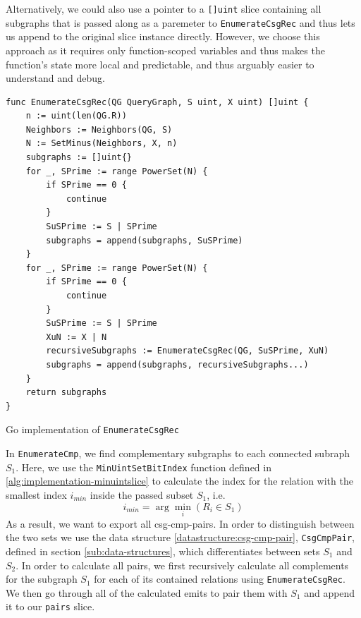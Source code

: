 \begin{note}
Alternatively, we could also use a pointer to a \texttt{[]uint} slice containing all subgraphs that is passed along as a paremeter to \texttt{EnumerateCsgRec} and thus lets us append to the original slice instance directly. However, we choose this approach as it requires only function-scoped variables and thus makes the function's state more local and predictable, and thus arguably easier to understand and debug.
\end{note}

\vspace{0.4cm}
\begin{algorithm}[H]
\begin{verbatim}
func EnumerateCsgRec(QG QueryGraph, S uint, X uint) []uint {
    n := uint(len(QG.R))
    Neighbors := Neighbors(QG, S)
    N := SetMinus(Neighbors, X, n)
    subgraphs := []uint{}
    for _, SPrime := range PowerSet(N) {
        if SPrime == 0 {
            continue
        }
        SuSPrime := S | SPrime
        subgraphs = append(subgraphs, SuSPrime)
    }
    for _, SPrime := range PowerSet(N) {
        if SPrime == 0 {
            continue
        }
        SuSPrime := S | SPrime
        XuN := X | N
        recursiveSubgraphs := EnumerateCsgRec(QG, SuSPrime, XuN)
        subgraphs = append(subgraphs, recursiveSubgraphs...)
    }
    return subgraphs
}
\end{verbatim}
\caption{Go implementation of \texttt{EnumerateCsgRec}}
\label{alg:enumeratecsgrec}
\end{algorithm}

In \texttt{EnumerateCmp}, we find complementary subgraphs to each connected subraph $S_1$.
Here, we use the \texttt{MinUintSetBitIndex} function defined in \ref{alg:implementation-minuintslice} to calculate the index for the relation with the smallest index $i_{min}$ inside the passed subset $S_1$, i.e.
\begin{equation}
i_{min} = \arg\min_i(R_i \in S_1)
\end{equation}
As a result, we want to export all csg-cmp-pairs. In order to distinguish between the two sets we use the data structure \ref{datastructure:csg-cmp-pair}, \texttt{CsgCmpPair}, defined in section \ref{sub:data-structures}, which differentiates between sets $S_1$ and $S_2$. In order to calculate all pairs, we first recursively calculate all complements for the subgraph $S_1$ for each of its contained relations using \texttt{EnumerateCsgRec}. We then go through all of the calculated emits to pair them with $S_1$ and append it to our \texttt{pairs} slice.

